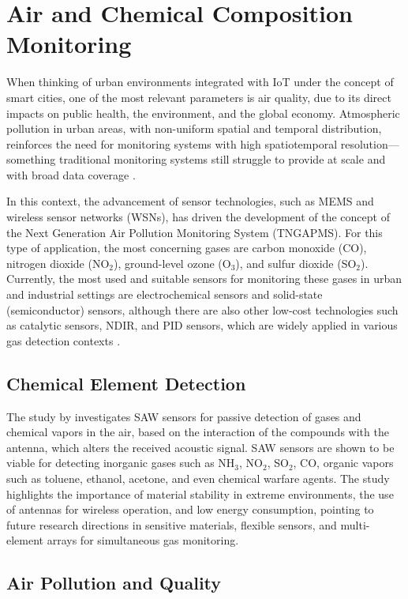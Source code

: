 \documentclass[conference]{IEEEtran}
\begin{document}
\section{Air and Chemical Composition Monitoring}

When thinking of urban environments integrated with IoT under the concept of smart cities, one of the most relevant parameters is air quality, due to its direct impacts on public health, the environment, and the global economy. Atmospheric pollution in urban areas, with non-uniform spatial and temporal distribution, reinforces the need for monitoring systems with high spatiotemporal resolution—something traditional monitoring systems still struggle to provide at scale and with broad data coverage \cite{yi_2015_a}.

In this context, the advancement of sensor technologies, such as MEMS and wireless sensor networks (WSNs), has driven the development of the concept of the Next Generation Air Pollution Monitoring System (TNGAPMS). For this type of application, the most concerning gases are carbon monoxide (CO), nitrogen dioxide (NO$_2$), ground-level ozone (O$_3$), and sulfur dioxide (SO$_2$). Currently, the most used and suitable sensors for monitoring these gases in urban and industrial settings are electrochemical sensors and solid-state (semiconductor) sensors, although there are also other low-cost technologies such as catalytic sensors, NDIR, and PID sensors, which are widely applied in various gas detection contexts \cite{yi_2015_a}.
\subsection{Chemical Element Detection}

The study by \cite{devkota_2017_saw} investigates SAW sensors for passive detection of gases and chemical vapors in the air, based on the interaction of the compounds with the antenna, which alters the received acoustic signal. SAW sensors are shown to be viable for detecting inorganic gases such as NH$_3$, NO$_2$, SO$_2$, CO, organic vapors such as toluene, ethanol, acetone, and even chemical warfare agents.
The study highlights the importance of material stability in extreme environments, the use of antennas for wireless operation, and low energy consumption, pointing to future research directions in sensitive materials, flexible sensors, and multi-element arrays for simultaneous gas monitoring.

\subsection{Air Pollution and Quality}
\end{document}
